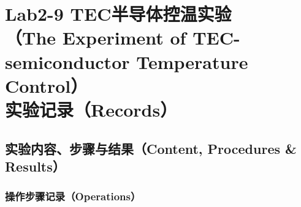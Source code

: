 \documentclass[dvipsnames, svgnames,a4paper,11pt]{article}
\begin{document}
	\section{Lab2-9 TEC半导体控温实验\\（The Experiment of TEC-semiconductor Temperature Control）\\ \quad\heiti 实验记录（Records）}
	
	\subsection{实验内容、步骤与结果（Content, Procedures \& Results）}
	
	\subsubsection{操作步骤记录（Operations）}
\end{document}
